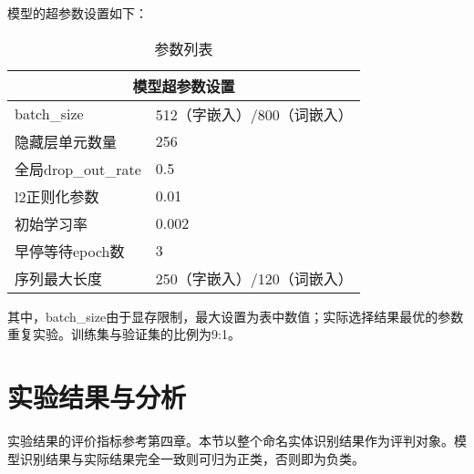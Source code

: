 模型的超参数设置如下：
\begin{table}[H]
    \centering
    \caption{参数列表}
    \begin{tabular}{ll}
        \toprule
        \multicolumn{2}{c}{模型超参数设置} \\
        \midrule
        batch\_size & 512（字嵌入）/800（词嵌入） \\
        隐藏层单元数量 & 256\\
        全局drop\_out\_rate & 0.5 \\
        l2正则化参数 & 0.01 \\
        初始学习率 & 0.002 \\
        早停等待epoch数 & 3\\
        序列最大长度 & 250（字嵌入）/120（词嵌入）\\
        \bottomrule
    \end{tabular}
\end{table}
其中，batch\_size由于显存限制，最大设置为表中数值；实际选择结果最优的参数重复实验。训练集与验证集的比例为9:1。

\section{实验结果与分析}
实验结果的评价指标参考第四章。本节以整个命名实体识别结果作为评判对象。模型识别结果与实际结果完全一致则可归为正类，否则即为负类。


